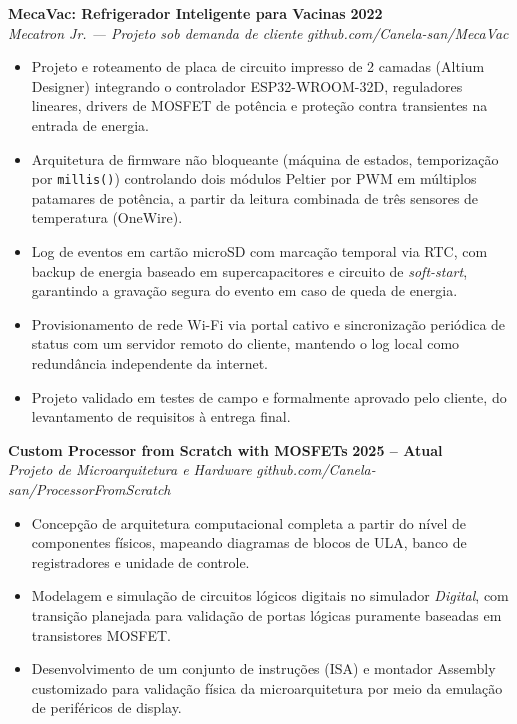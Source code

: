 \documentclass[a4paper,11pt]{article}
\newcommand{\entry}[4]{%
  \noindent\textbf{#1} \hfill \textbf{#2}\\
  \textit{#3} \hfill \textit{#4}
  \vspace{3pt}
}
\newcommand{\entrygap}{\vspace{9pt}}
\begin{document}
\entry{MecaVac: Refrigerador Inteligente para Vacinas}{2022}{Mecatron Jr. --- Projeto sob demanda de cliente}{github.com/Canela-san/MecaVac}
\begin{itemize}
\item Projeto e roteamento de placa de circuito impresso de 2 camadas (Altium Designer) integrando o controlador ESP32-WROOM-32D, reguladores lineares, drivers de MOSFET de potência e proteção contra transientes na entrada de energia.
\item Arquitetura de firmware não bloqueante (máquina de estados, temporização por \texttt{millis()}) controlando dois módulos Peltier por PWM em múltiplos patamares de potência, a partir da leitura combinada de três sensores de temperatura (OneWire).
\item Log de eventos em cartão microSD com marcação temporal via RTC, com backup de energia baseado em supercapacitores e circuito de \textit{soft-start}, garantindo a gravação segura do evento em caso de queda de energia.
\item Provisionamento de rede Wi-Fi via portal cativo e sincronização periódica de status com um servidor remoto do cliente, mantendo o log local como redundância independente da internet.
\item Projeto validado em testes de campo e formalmente aprovado pelo cliente, do levantamento de requisitos à entrega final.
\end{itemize}
\entrygap

\entry{Custom Processor from Scratch with MOSFETs}{2025 -- Atual}{Projeto de Microarquitetura e Hardware}{github.com/Canela-san/ProcessorFromScratch}
\begin{itemize}
\item Concepção de arquitetura computacional completa a partir do nível de componentes físicos, mapeando diagramas de blocos de ULA, banco de registradores e unidade de controle.
\item Modelagem e simulação de circuitos lógicos digitais no simulador \textit{Digital}, com transição planejada para validação de portas lógicas puramente baseadas em transistores MOSFET.
\item Desenvolvimento de um conjunto de instruções (ISA) e montador Assembly customizado para validação física da microarquitetura por meio da emulação de periféricos de display.
\end{itemize}
\entrygap
\end{document}
